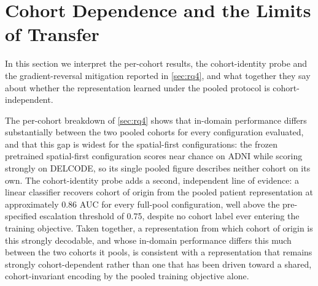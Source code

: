 \section{Cohort Dependence and the Limits of Transfer}\label{sec:cohort-dependence}

In this section we interpret the per-cohort results, the cohort-identity probe and the
gradient-reversal mitigation reported in \autoref{sec:rq4}, and what together they say
about whether the representation learned under the pooled protocol is cohort-independent.

The per-cohort breakdown of \autoref{sec:rq4} shows that in-domain performance differs
substantially between the two pooled cohorts for every configuration evaluated, and that
this gap is widest for the spatial-first configurations: the frozen pretrained
spatial-first configuration scores near chance on \ac{ADNI} while scoring strongly on
\ac{DELCODE}, so its single pooled figure describes neither cohort on its own. The
cohort-identity probe adds a second, independent line of evidence: a linear classifier
recovers cohort of origin from the pooled patient representation at approximately 0.86
\ac{AUC} for every full-pool configuration, well above the pre-specified escalation
threshold of 0.75, despite no cohort label ever entering the training objective. Taken
together, a representation from which cohort of origin is this strongly decodable, and
whose in-domain performance differs this much between the two cohorts it pools, is
consistent with a representation that remains strongly cohort-dependent rather than one
that has been driven toward a shared, cohort-invariant encoding by the pooled training
objective alone.

